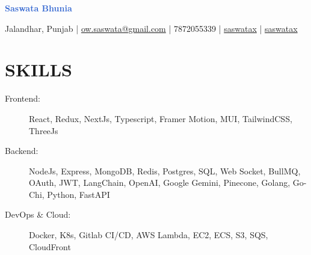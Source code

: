 \documentclass[]{resume}
\begin{document}
\textrm{\Huge\textcolor{highlight}{\textbf{Saswata Bhunia}}}
\vspace{.4em}

Jalandhar, Punjab | \href{mailto:ow.saswata@gmail.com}{ow.saswata@gmail.com} | 7872055339 | \href{https://www.linkedin.com/in/saswatax}{\faLinkedin \space saswatax} | \href{https://github.com/saswatax}{\faGithub \space saswatax}
\vspace{.4em}


\section{SKILLS}
\begin{description}
  \item[Frontend:] React, Redux, NextJs, Typescript, Framer Motion, MUI, TailwindCSS, ThreeJs 
  \item[Backend:] NodeJs, Express, MongoDB, Redis, Postgres, SQL, Web Socket, BullMQ, OAuth, JWT, LangChain, OpenAI, Google Gemini, Pinecone, Golang, Go-Chi, Python, FastAPI
  \item[DevOps \& Cloud:] Docker, K8s, Gitlab CI/CD, AWS Lambda, EC2, ECS, S3, SQS, CloudFront
\end{description}
\end{document}
